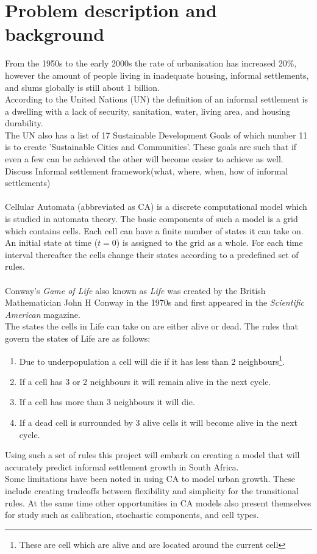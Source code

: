 \section{Problem description and background}
From the 1950s to the early 2000s the rate of urbanisation has increased 20\%, however the amount of people living in inadequate housing, informal settlements, and slums globally is still about 1 billion.\cite{un}\\
According to the United Nations (UN) the definition of an informal settlement is a dwelling with a lack of security, sanitation, water, living area, and housing durability.\cite{un1} \\
The UN also has a list of 17 Sustainable Development Goals of which number 11 is to create 'Sustainable Cities and Communities'. These goals are such that if even a few can be achieved the other will become easier to achieve as well.
Discuss Informal settlement framework(what, where, when, how of informal settlements)\\\\
Cellular Automata (abbreviated as CA) is a discrete computational model which is studied in automata theory. The basic components of such a model is a grid which contains cells. Each cell can have a finite number of states it can take on. An initial state at time ($t = 0$) is assigned to the grid as a whole. For each time interval thereafter the cells change their states according to a predefined set of rules.\cite{ca}\\\\
Conway's \textit{Game of Life} also known as \textit{Life} was created by the British Mathematician John H Conway in the 1970s and first appeared in the \textit{Scientific American} magazine.\cite{conway}\\
The states the cells in Life can take on are either alive or dead. The rules that govern the states of Life are as follows:
\begin{enumerate}
\item Due to underpopulation a cell will die if it has less than 2 neighbours\footnote{These are cell which are alive and are located around the current cell}.
\item If a cell has 3 or 2 neighbours it will remain alive in the next cycle.
\item If a cell has more than 3 neighbours it will die.
\item If a dead cell is surrounded by 3 alive cells it will become alive in the next cycle.
\end{enumerate}
Using such a set of rules this project will embark on creating a model that will accurately predict informal settlement growth in South Africa.\\
Some limitations have been noted in using CA to model urban growth. These include creating tradeoffs between flexibility and simplicity for the transitional rules. At the same time other opportunities in CA models also present themselves for study such as calibration, stochastic components, and cell types.\cite{ca1}
